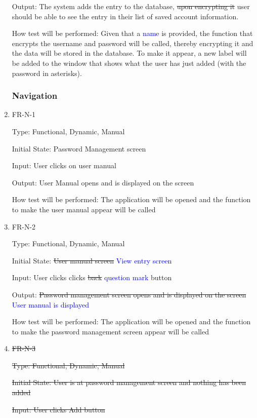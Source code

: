 \documentclass[12pt, titlepage]{article}
\begin{document}
\begin{enumerate}
Output: The system adds the entry to the database, \sout{upon encrypting it} user should be able to see the entry in their list of saved account information.

How test will be performed: Given that a \textcolor{blue}{name} is provided, the function that encrypts the username and password will be called, thereby encrypting it and the data will be stored in the database. To make it appear, a new label will be added to the window that shows what the user has just added (with the password in asterisks).

\subsubsection{Navigation}

\item{FR-N-1\\}

Type: Functional, Dynamic, Manual

Initial State: Password Management screen

Input: User clicks on user manual

Output: User Manual opens and is displayed on the screen

How test will be performed: The application will be opened and the function to make the user manual appear will be called

\item{FR-N-2\\}

Type: Functional, Dynamic, Manual

Initial State: \sout{User manual screen} \textcolor{blue}{View entry screen}

Input: User clicks clicks \sout{back} \textcolor{blue}{question mark} button

Output: \sout{Password management screen opens and is displayed on the screen} \textcolor{blue}{User manual is displayed}

How test will be performed: The application will be opened and the function to make the password management screen appear will be called

\item{\sout{FR-N-3}\\}

\sout{Type: Functional, Dynamic, Manual}

\sout{Initial State: User is at password management screen and nothing has been added}

\sout{Input: User clicks Add button}


\end{enumerate}
\end{document}

